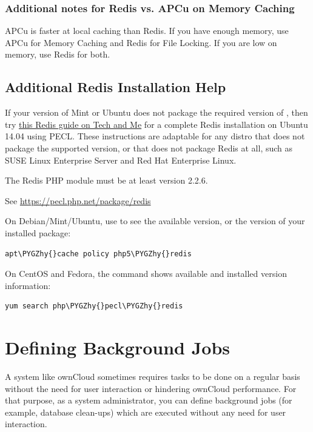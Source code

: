 \documentclass[letterpaper,10pt,english]{sphinxmanual}
\def\PYGZhy{\char`\-}
\begin{document}
\subsubsection{Additional notes for Redis vs. APCu on Memory Caching}
\label{configuration_server/caching_configuration:additional-notes-for-redis-vs-apcu-on-memory-caching}
APCu is faster at local caching than Redis. If you have enough memory, use APCu for Memory Caching
and Redis for File Locking. If you are low on memory, use Redis for both.


\subsection{Additional Redis Installation Help}
\label{configuration_server/caching_configuration:additional-redis-installation-help}\label{configuration_server/caching_configuration:install-redis-label}
If your version of Mint or Ubuntu does not package the required version of
, then try \href{https://www.techandme.se/how-to-configure-redis-cache-in-ubuntu-14-04-with-owncloud/}{this Redis guide on Tech and Me} for a complete Redis installation on Ubuntu 14.04 using PECL.
These instructions are adaptable for any distro that does not package the
supported version, or that does not package Redis at all, such as SUSE Linux
Enterprise Server and Red Hat Enterprise Linux.

The Redis PHP module must be at least version 2.2.6.

See \href{https://pecl.php.net/package/redis}{https://pecl.php.net/package/redis}

On Debian/Mint/Ubuntu, use  to see the available
 version, or the version of your installed package:

\begin{Verbatim}[commandchars=\\\{\}]
apt\PYGZhy{}cache policy php5\PYGZhy{}redis
\end{Verbatim}

On CentOS and Fedora, the  command shows available and installed version
information:

\begin{Verbatim}[commandchars=\\\{\}]
yum search php\PYGZhy{}pecl\PYGZhy{}redis
\end{Verbatim}


\section{Defining Background Jobs}
\label{configuration_server/background_jobs_configuration:defining-background-jobs}\label{configuration_server/background_jobs_configuration::doc}
A system like ownCloud sometimes requires tasks to be done on a regular basis without the need for user interaction or hindering ownCloud performance. For that purpose, as a system administrator, you can define background jobs (for example, database clean-ups) which are executed without any need for user interaction.
\end{document}
